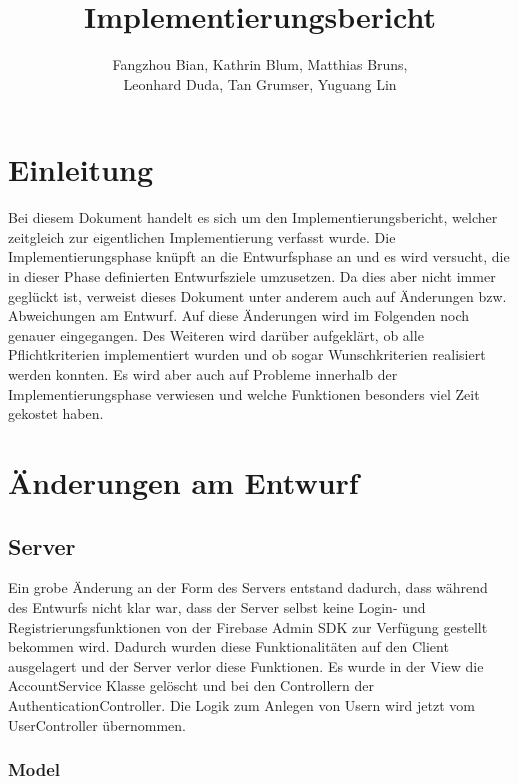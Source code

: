 \documentclass[a4paper]{scrreprt}
\begin{document}
\title{Implementierungsbericht}
\author{Fangzhou Bian, Kathrin Blum, Matthias Bruns, \\Leonhard Duda, Tan Grumser, Yuguang Lin}
\maketitle
\tableofcontents



\chapter{Einleitung}

Bei diesem Dokument handelt es sich um den Implementierungsbericht, welcher zeitgleich zur eigentlichen Implementierung verfasst wurde. Die Implementierungsphase knüpft an die Entwurfsphase an und es wird versucht, die in dieser Phase definierten Entwurfsziele umzusetzen. Da dies aber nicht immer geglückt ist, verweist dieses Dokument unter anderem auch auf Änderungen bzw. Abweichungen am Entwurf. Auf diese Änderungen wird im Folgenden noch genauer eingegangen. Des Weiteren wird darüber aufgeklärt, ob alle Pflichtkriterien implementiert wurden und ob sogar Wunschkriterien realisiert werden konnten. Es wird aber auch auf Probleme innerhalb der Implementierungsphase verwiesen und welche Funktionen besonders viel Zeit gekostet haben.

\chapter{Änderungen am Entwurf}
\section{Server}
Ein grobe Änderung an der Form des Servers entstand dadurch, dass während des Entwurfs nicht klar war, dass der Server selbst keine Login- und Registrierungsfunktionen von der Firebase Admin SDK zur Verfügung gestellt bekommen wird. Dadurch wurden diese Funktionalitäten auf den Client ausgelagert und der Server verlor diese Funktionen. Es wurde in der View die AccountService Klasse gelöscht und bei den Controllern der AuthenticationController. Die Logik zum Anlegen von Usern wird jetzt vom UserController übernommen.
\subsection{Model}
\end{document}
